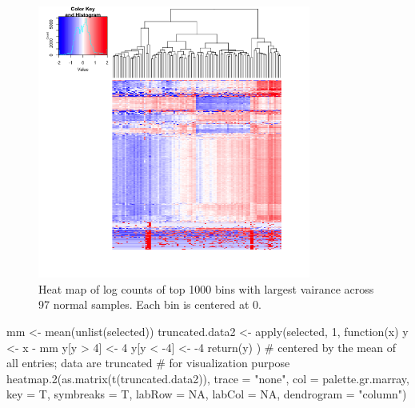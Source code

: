 \documentclass{article}
\begin{document}
\begin{figure}
\begin{center}
\includegraphics[width=0.8\textwidth]{figure/heatmap-1}
\end{center}
\caption{Heat map of log counts of top 1000 bins with largest vairance across 97 normal samples. Each bin is centered at 0.}
\label{heatmap1}
\end{figure}

\begin{Schunk}
\begin{Sinput}
 mm <- mean(unlist(selected))
 truncated.data2 <- apply(selected, 1, function(x){
   y <- x - mm
 	y[y > 4] <- 4
 	y[y < -4] <- -4
 	return(y)
 })
 # centered by the mean of all entries; data are truncated
 # for visualization purpose
 heatmap.2(as.matrix(t(truncated.data2)), trace = "none",
   col = palette.gr.marray, key = T, symbreaks = T, labRow = NA,
   labCol = NA, dendrogram = "column")
\end{Sinput}
\end{Schunk}
\end{document}
